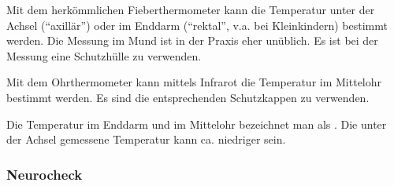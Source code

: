 Mit dem
herkömmlichen Fieberthermometer kann die Temperatur unter
der Achsel ("`axillär"') oder im Enddarm ("`rektal"', v.a.
bei Kleinkindern) bestimmt werden. Die Messung im Mund ist
in der Praxis eher unüblich. Es ist bei der Messung eine
Schutzhülle zu verwenden. 

Mit dem Ohrthermometer kann mittels Infrarot die
Temperatur im Mittelohr bestimmt werden. Es sind die
entsprechenden Schutzkappen zu verwenden.

Die Temperatur im Enddarm und im Mittelohr bezeichnet man
als . Die unter der Achsel
gemessene Temperatur kann ca. \textcelsius{}
niedriger sein.



\subsubsection{Neurocheck}

